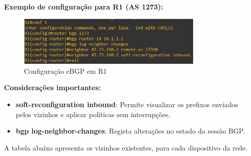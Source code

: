 \documentclass[11pt,english, openright, oneside]{book}
\begin{document}
\pagebreak
\textbf{Exemplo de configuração para R1 (AS 1273):} \par
\begin{figure}[H]
  \centering
  \includegraphics[width=0.80\textwidth]{imagens/Tarefa2/1.png}
  \caption{Configuração eBGP em R1}
  \label{fig:eBGP_R1}
\end{figure}
\vspace{0.2cm}

\textbf{Considerações importantes:}
\begin{itemize}
  \item \textbf{soft-reconfiguration inbound}: Permite visualizar os prefixos enviados pelos vizinhos e aplicar políticas sem interrupções.
  \item \textbf{bgp log-neighbor-changes}: Regista alterações no estado da sessão BGP.
\end{itemize}

\pagebreak
A tabela abaixo apresenta os vizinhos existentes, para cada dispositivo da rede.
\vspace{0.2cm}
\end{document}
